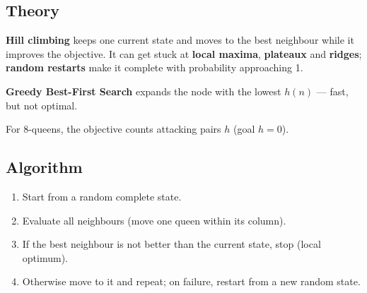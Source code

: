 \documentclass[11pt]{article}
\begin{document}
\subsection*{Theory}
\textbf{Hill climbing} keeps one current state and moves to the best neighbour while it improves the objective. It can get stuck at \textbf{local maxima}, \textbf{plateaux} and \textbf{ridges}; \textbf{random restarts} make it complete with probability approaching 1.

\textbf{Greedy Best-First Search} expands the node with the lowest $h(n)$ --- fast, but not optimal.

For 8-queens, the objective counts attacking pairs $h$ (goal $h=0$).
\subsection*{Algorithm}
\begin{algo}[Procedure]\begin{enumerate}
\item Start from a random complete state.
\item Evaluate all neighbours (move one queen within its column).
\item If the best neighbour is not better than the current state, stop (local optimum).
\item Otherwise move to it and repeat; on failure, restart from a new random state.
\end{enumerate}\end{algo}
\end{document}
